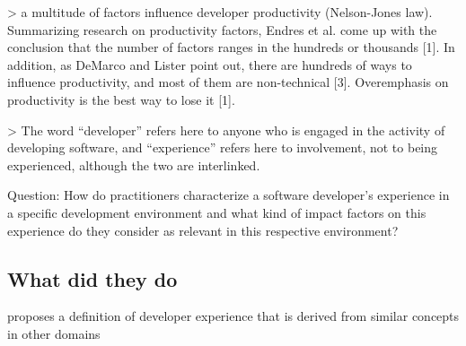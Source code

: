 > a multitude of factors influence developer productivity (Nelson-Jones law).
Summarizing research on productivity factors, Endres et al.
come up with the conclusion that the number of factors
ranges in the hundreds or thousands [1]. In addition, as
DeMarco and Lister point out, there are hundreds of ways to
influence productivity, and most of them are non-technical
[3]. Overemphasis on productivity is the best way to lose it [1].

> The word “developer” refers here to anyone who is engaged in the activity of developing software, and “experience” refers here to involvement, not to being experienced, although the two are interlinked.

Question: How do practitioners characterize a
software developer’s experience in a specific development
environment and what kind of impact factors on this experience do they consider as relevant in this respective
environment?

\subsection{What did they do}

proposes a definition of developer experience that is derived from similar concepts in other domains
